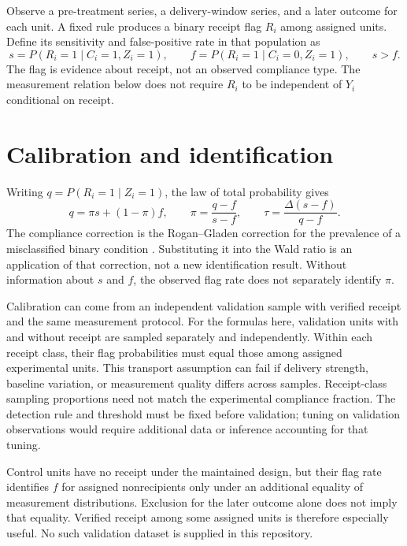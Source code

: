 \documentclass[11pt]{article}
\begin{document}
Observe a pre-treatment series, a delivery-window series, and a later outcome for each unit. A fixed rule produces a binary receipt flag $R_i$ among assigned units. Define its sensitivity and false-positive rate in that population as
\begin{equation}\label{eq:rates}
s=P(R_i=1\mid C_i=1,Z_i=1),\qquad
f=P(R_i=1\mid C_i=0,Z_i=1),\qquad s>f.
\end{equation}
The flag is evidence about receipt, not an observed compliance type. The measurement relation below does not require $R_i$ to be independent of $Y_i$ conditional on receipt.

\section{Calibration and identification}

Writing $q=P(R_i=1\mid Z_i=1)$, the law of total probability gives
\begin{equation}\label{eq:correction}
q=\pi s+(1-\pi)f,\qquad
\pi=\frac{q-f}{s-f},\qquad
\tau=\frac{\Delta(s-f)}{q-f}.
\end{equation}
The compliance correction is the Rogan--Gladen correction for the prevalence of a misclassified binary condition \citep{rogan1978}. Substituting it into the Wald ratio is an application of that correction, not a new identification result. Without information about $s$ and $f$, the observed flag rate does not separately identify $\pi$.

Calibration can come from an independent validation sample with verified receipt and the same measurement protocol. For the formulas here, validation units with and without receipt are sampled separately and independently. Within each receipt class, their flag probabilities must equal those among assigned experimental units. This transport assumption can fail if delivery strength, baseline variation, or measurement quality differs across samples. Receipt-class sampling proportions need not match the experimental compliance fraction. The detection rule and threshold must be fixed before validation; tuning on validation observations would require additional data or inference accounting for that tuning.

Control units have no receipt under the maintained design, but their flag rate identifies $f$ for assigned nonrecipients only under an additional equality of measurement distributions. Exclusion for the later outcome alone does not imply that equality. Verified receipt among some assigned units is therefore especially useful. No such validation dataset is supplied in this repository.
\end{document}
